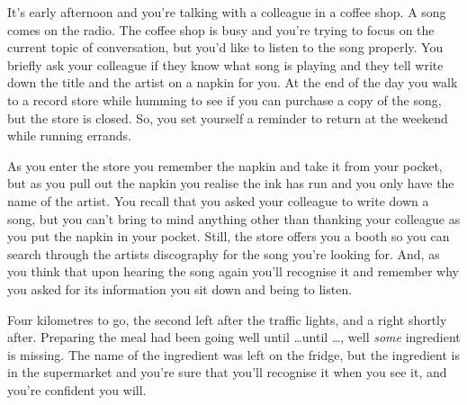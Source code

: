 \documentclass[10pt]{article}
\newcommand{\hozlinedash}[0]{%
  \noindent\hdashrule[0.5ex][c]{\textwidth}{.1pt}{2.5pt}
}
\begin{document}
\begin{scenario}\label{scn:song}
  It's early afternoon and you're talking with a colleague in a coffee shop.
  A song comes on the radio.
  The coffee shop is busy and you're trying to focus on the current topic of conversation, but you'd like to listen to the song properly.
  You briefly ask your colleague if they know what song is playing and they tell write down the title and the artist on a napkin for you.
  At the end of the day you walk to a record store while humming to see if you can purchase a copy of the song, but the store is closed.
  So, you set yourself a reminder to return at the weekend while running errands.

  As you enter the store you remember the napkin and take it from your pocket, but as you pull out the napkin you realise the ink has run and you only have the name of the artist.
  You recall that you asked your colleague to write down a song, but you can't bring to mind anything other than thanking your colleague as you put the napkin in your pocket.
  Still, the store offers you a booth so you can search through the artists discography for the song you're looking for.
  And, as you think that upon hearing the song again you'll recognise it and remember why you asked for its information you sit down and being to listen.
\end{scenario}


\hozlinedash


\begin{scenario}
  Four kilometres to go, the second left after the traffic lights, and a right shortly after.
  Preparing the meal had been going well until \dots until \dots, well \emph{some} ingredient is missing.
  The name of the ingredient was left on the fridge, but the ingredient is in the supermarket and you're sure that you'll recognise it when you see it, and you're confident you will.
\end{scenario}
\end{document}
